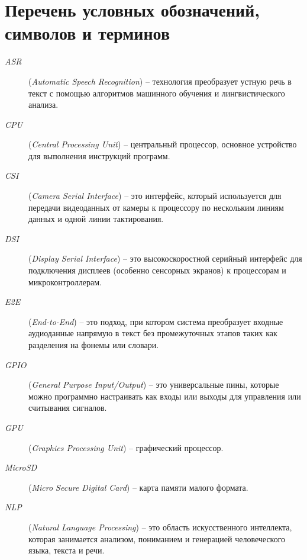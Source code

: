 \section*{Перечень условных обозначений, символов и терминов}




\begin{description}
	\item[\normalfont \textit{ASR}] (\textit{Automatic Speech Recognition}) -- технология преобразует устную речь в текст с помощью алгоритмов машинного обучения и лингвистического анализа.
	
	\item[\normalfont \textit{CPU}] (\textit{Central Processing Unit}) -- центральный процессор, основное устройство для выполнения инструкций программ.
	
	\item[\normalfont \textit{CSI}] (\textit{Camera Serial Interface}) -- это интерфейс, который используется для передачи видеоданных от камеры к процессору по нескольким линиям данных и одной линии тактирования.
	
	\item[\normalfont \textit{DSI}] (\textit{Display Serial Interface}) -- это высокоскоростной серийный интерфейс для подключения дисплеев (особенно сенсорных экранов) к процессорам и микроконтроллерам.
	
	\item[\normalfont \textit{E2E}] (\textit{End-to-End}) -- это подход, при котором система преобразует входные аудиоданные напрямую в текст без промежуточных этапов таких как разделения на фонемы или словари.
	
	\item[\normalfont \textit{GPIO}] (\textit{General Purpose Input/Output}) -- это универсальные пины, которые можно программно настраивать как входы или выходы для управления или считывания сигналов.
	
	\item[\normalfont \textit{GPU}] (\textit{Graphics Processing Unit}) -- графический процессор.
	
	\item[\normalfont \textit{MicroSD}] (\textit{Micro Secure Digital Card}) -- карта памяти малого формата.
	
	\item[\normalfont \textit{NLP}] (\textit{Natural Language Processing}) -- это область искусственного интеллекта, которая занимается анализом, пониманием и генерацией человеческого языка, текста и речи.
	

\end{description}
